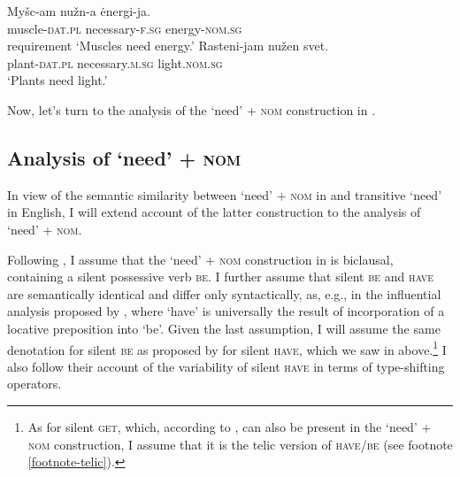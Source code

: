 \documentclass[output=paper]{langscibook}
\begin{document}
\ea \ea \label{nuzhen-muscles}\gll Myšc-am nužn-a ėnergi-ja. \\
muscle-\textsc{dat.pl} necessary-\textsc{f.sg} energy-\textsc{nom.sg}\\ \hfill requirement
\glt `Muscles need energy.'
\ex \label{nuzhen-plants}\gll Rasteni-jam nužen svet.\\
plant-\textsc{dat.pl} necessary.\textsc{m.sg} light.\textsc{nom.sg}\\
\glt `Plants need light.'
\z\z

\noindent Now, let's turn to the analysis of the `need' + \textsc{nom} construction in .

\subsection{Analysis of `need' + \textsc{nom}\label{section-nom-analysis}}

In view of the semantic similarity between `need' + \textsc{nom} in  and transitive `need' in English, I will extend  account of the latter construction to the analysis of `need' + \textsc{nom}.

Following \citet{Harves2008}, I assume that the `need' + \textsc{nom} construction in  is biclausal, containing a silent possessive verb \textsc{be}. I further assume that silent \textsc{be} and \textsc{have} are semantically identical and differ only syntactically, as, e.g., in the influential analysis proposed by \citet{Freeze1992}, where `have' is universally the result of incorporation of a locative preposition into `be'. Given the last assumption, I will assume the same denotation for silent \textsc{be} as proposed by \citet{Zaroukian.Beller2013} for silent \textsc{have}, which we saw in  above.\footnote{As for silent \textsc{get}, which, according to \citet{Harves2008}, can also be present in the `need' + \textsc{nom} construction, I assume that it is the telic version of \textsc{have}/\textsc{be} (see footnote \ref{footnote-telic}).} I also follow their account of the variability of silent \textsc{have} in terms of type-shifting operators.
\end{document}
